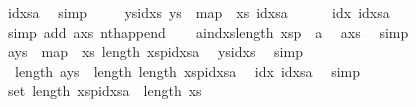 \begin{isabellebody}
\ idxsa\ \isamarkupfalse%
\ simp\ \isanewline
\ \ \isamarkupfalse%
\ ys{\isacharunderscore}{\kern0pt}idxs{\isacharcolon}{\kern0pt}\ {\isachardoublequoteopen}ys\ {\isacharequal}{\kern0pt}\ map\ {\isacharparenleft}{\kern0pt}{\isacharparenleft}{\kern0pt}{\isacharbang}{\kern0pt}{\isacharparenright}{\kern0pt}\ xs{\isacharparenright}{\kern0pt}\ idxsa{\isachardoublequoteclose}\isanewline
\ \ \ \ \isamarkupfalse%
\ idx{\isacharparenleft}{\kern0pt}{}{\isacharparenright}{\kern0pt}\ idxsa\ \isamarkupfalse%
\ {\isacharparenleft}{\kern0pt}simp\ add{\isacharcolon}{\kern0pt}\ a{\isacharunderscore}{\kern0pt}xs{\isacharparenleft}{\kern0pt}{}{\isacharparenright}{\kern0pt}\ nth{\isacharunderscore}{\kern0pt}append{\isacharparenright}{\kern0pt}\isanewline
\ \ \isamarkupfalse%
\ aind{\isacharcolon}{\kern0pt}{\isachardoublequoteopen}xs{\isacharbang}{\kern0pt}length\ xsp\ {\isacharequal}{\kern0pt}\ a{\isachardoublequoteclose}\ \isamarkupfalse%
\ a{\isacharunderscore}{\kern0pt}xs\ \isamarkupfalse%
\ simp\isanewline
\ \ \isamarkupfalse%
\ {}{\isacharcolon}{\kern0pt}{\isachardoublequoteopen}{\isacharparenleft}{\kern0pt}a{\isacharhash}{\kern0pt}ys{\isacharparenright}{\kern0pt}\ {\isacharequal}{\kern0pt}\ map\ {\isacharparenleft}{\kern0pt}{\isacharparenleft}{\kern0pt}{\isacharbang}{\kern0pt}{\isacharparenright}{\kern0pt}\ xs{\isacharparenright}{\kern0pt}\ {\isacharparenleft}{\kern0pt}{\isacharparenleft}{\kern0pt}length\ xsp{\isacharparenright}{\kern0pt}{\isacharhash}{\kern0pt}idxsa{\isacharparenright}{\kern0pt}{\isachardoublequoteclose}\ \isamarkupfalse%
\ ys{\isacharunderscore}{\kern0pt}idxs\ \isamarkupfalse%
\ simp\isanewline
\ \ \isamarkupfalse%
\ \ {}{\isacharcolon}{\kern0pt}{\isachardoublequoteopen}length\ {\isacharparenleft}{\kern0pt}a{\isacharhash}{\kern0pt}ys{\isacharparenright}{\kern0pt}\ {\isacharequal}{\kern0pt}\ length\ {\isacharparenleft}{\kern0pt}{\isacharparenleft}{\kern0pt}length\ xsp{\isacharparenright}{\kern0pt}{\isacharhash}{\kern0pt}idxsa{\isacharparenright}{\kern0pt}{\isachardoublequoteclose}\ \isamarkupfalse%
\ idx{\isacharparenleft}{\kern0pt}{}{\isacharparenright}{\kern0pt}\ idxsa\ \isamarkupfalse%
\ simp\isanewline
\ \ \isamarkupfalse%
\ {}{\isacharcolon}{\kern0pt}{\isachardoublequoteopen}set\ {\isacharparenleft}{\kern0pt}{\isacharparenleft}{\kern0pt}length\ xsp{\isacharparenright}{\kern0pt}{\isacharhash}{\kern0pt}idxsa{\isacharparenright}{\kern0pt}\ {\isasymsubseteq}\ {\isacharbraceleft}{\kern0pt}{\isachardot}{\kern0pt}{\isachardot}{\kern0pt}{\isacharless}{\kern0pt}length\ xs{\isacharbraceright}{\kern0pt}{\isachardoublequoteclose}\ \ \isamarkupfalse%

\end{isabellebody}
